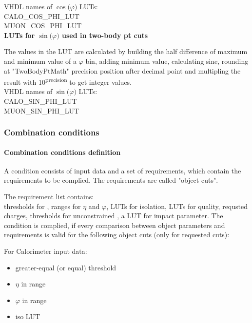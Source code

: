 VHDL names of $\cos($$\varphi$$)$ LUTs:\\
CALO\_COS\_PHI\_LUT\\
MUON\_COS\_PHI\_LUT\\

\textbf{LUTs for $\sin($$\varphi$$)$ used in two-body pt cuts}
\label{sec:gtl:calc_luts_sin_phi}

The values in the LUT are calculated by building the half difference of maximum and minimum value of a $\varphi$ bin, adding minimum value, calculating sine, rounding at "TwoBodyPtMath" precision position after decimal point and multipling the result with 10\textsuperscript{\tiny{precision}} to get integer values.\\

VHDL names of $\sin($$\varphi$$)$ LUTs:\\
CALO\_SIN\_PHI\_LUT\\
MUON\_SIN\_PHI\_LUT\\

\clearpage

\subsubsection{Combination conditions}
\label{sec:gtl:combination_conditions}

\paragraph{Combination conditions definition}
\label{sec:gtl:comb_cond_def}

A condition consists of input data and a set of requirements, which contain the requirements to be complied. The requirements are called "object cuts".

The requirement list contains:\\
thresholds for \pt, ranges for $\eta$ and $\varphi$, LUTs for isolation, LUTs for quality, requsted charges, thresholds for unconstrained \pt, a LUT for impact parameter.
The condition is complied, if every comparison between object parameters and requirements is valid for the following object cuts (only for requested cuts):

For Calorimeter input data:
\begin{itemize}
\item \pt greater-equal (or equal) threshold
\item $\eta$ in range
\item $\varphi$ in range
\item iso LUT
\end{itemize}

